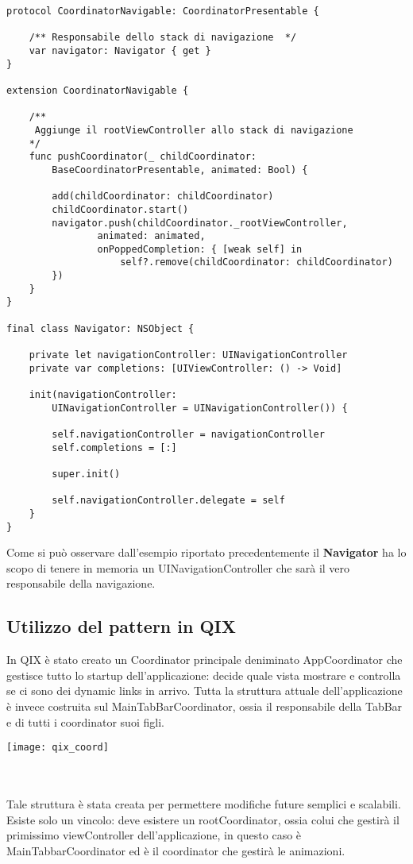 \begin{verbatim}
protocol CoordinatorNavigable: CoordinatorPresentable {
    
    /** Responsabile dello stack di navigazione  */
    var navigator: Navigator { get }
}

extension CoordinatorNavigable {
    
    /**
     Aggiunge il rootViewController allo stack di navigazione
    */
    func pushCoordinator(_ childCoordinator:
        BaseCoordinatorPresentable, animated: Bool) {

        add(childCoordinator: childCoordinator)
        childCoordinator.start()
        navigator.push(childCoordinator._rootViewController,
                animated: animated,
                onPoppedCompletion: { [weak self] in
                    self?.remove(childCoordinator: childCoordinator)
        })
    }
}

final class Navigator: NSObject {

    private let navigationController: UINavigationController
    private var completions: [UIViewController: () -> Void]
    
    init(navigationController:
        UINavigationController = UINavigationController()) {
            
        self.navigationController = navigationController
        self.completions = [:]
        
        super.init()
        
        self.navigationController.delegate = self
    }
}
\end{verbatim}

Come si può osservare dall'esempio riportato precedentemente il \textbf{Navigator}
ha lo scopo di tenere in memoria un UINavigationController che sarà il vero 
responsabile della navigazione.

\subsection{Utilizzo del pattern in QIX}

In QIX è stato creato un Coordinator principale deniminato AppCoordinator che gestisce
tutto lo startup dell'applicazione: decide quale vista mostrare e controlla se ci sono dei dynamic links in arrivo.
Tutta la struttura attuale dell'applicazione è invece costruita sul MainTabBarCoordinator, ossia il responsabile
della TabBar e di tutti i coordinator suoi figli.\\

\begin{minipage}{\linewidth}
    \centering
    \texttt{[image: qix\_coord]}
    \label{fig:8}
\end{minipage} \\ \\

Tale struttura è stata creata per permettere modifiche future semplici e scalabili.
Esiste solo un vincolo: deve esistere un rootCoordinator, ossia colui che gestirà il primissimo viewController dell'applicazione, in questo caso è MainTabbarCoordinator ed è il
coordinator che gestirà le animazioni.